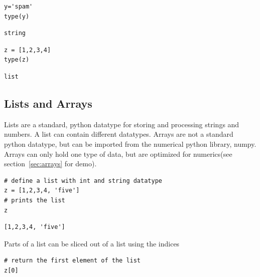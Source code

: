 \documentclass[%
oneside,                 %
final,                   %
10pt]{article}
\begin{document}
\begin{verbatim}
y='spam'
type(y)
\end{verbatim}

\begin{verbatim}
string
\end{verbatim}


\begin{verbatim}
z = [1,2,3,4]
type(z)
\end{verbatim}

\begin{verbatim}
list
\end{verbatim}

\subsection{Lists and Arrays}

Lists are a standard, python datatype for storing and processing strings and numbers. A list can contain different datatypes. Arrays are not a standard python datatype, but can be imported from the numerical python library, numpy. Arrays can only hold one type of data, but are optimized for numerics(see section~\ref{sec:arrays} for demo).

\begin{verbatim}
# define a list with int and string datatype
z = [1,2,3,4, 'five']
# prints the list
z
\end{verbatim}

\begin{verbatim}
[1,2,3,4, 'five']
\end{verbatim}

Parts of a list can be sliced out of a list using the indices
\begin{verbatim}
# return the first element of the list
z[0]
\end{verbatim}
\end{document}
